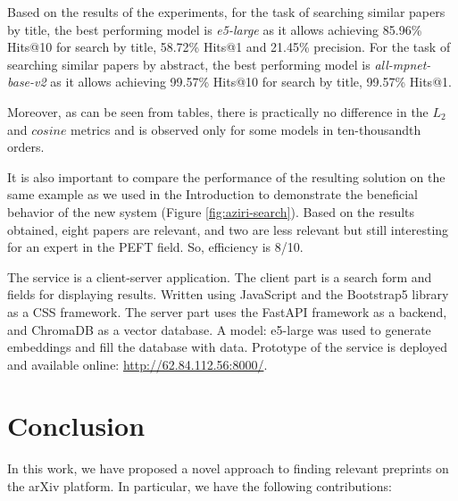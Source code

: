 \documentclass{article}
\begin{document}
        
    
        Based on the results of the experiments, for the task of searching similar papers by title, the best performing model is \textit{e5-large} as it allows achieving 85.96\% Hits@10 for search by title, 58.72\% Hits@1 and 21.45\% precision. For the task of searching similar papers by abstract, the best performing model is \textit{all-mpnet-base-v2} as it allows achieving 99.57\% Hits@10 for search by title, 99.57\% Hits@1.
    
        Moreover, as can be seen from tables, there is practically no difference in the \(L_{2}\) and \(cosine\) metrics and is observed only for some models in ten-thousandth orders.
    
        It is also important to compare the performance of the resulting solution on the same example as we used in the Introduction to demonstrate the beneficial behavior of the new system (Figure \ref{fig:aziri-search}). Based on the results obtained, eight papers are relevant, and two are less relevant but still interesting for an expert in the PEFT field. So, efficiency is 8/10.
    
        The service is a client-server application. The client part is a search form and fields for displaying results. Written using JavaScript and the Bootstrap5 library as a CSS framework. The server part uses the FastAPI framework as a backend, and ChromaDB as a vector database. A model: e5-large was used to generate embeddings and fill the database with data. Prototype of the service is deployed and available online: \url{http://62.84.112.56:8000/}.
        
    
    \section{Conclusion}
    
        In this work, we have proposed a novel approach to finding relevant preprints on the arXiv platform. In particular, we have the following contributions:
        
\end{document}

